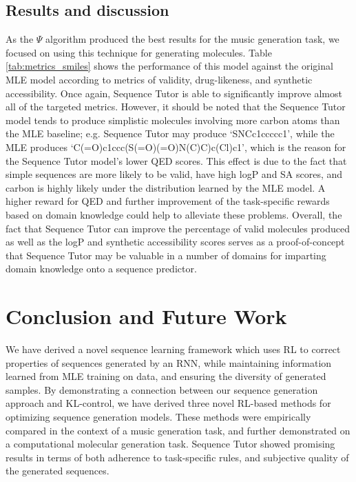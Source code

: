 \subsection{Results and discussion} As the $\Psi$ algorithm produced the best results for the music generation task, we focused on using this technique for generating molecules. Table \ref{tab:metrics_smiles} shows the performance of this model against the original MLE model according to metrics of validity, drug-likeness, and synthetic accessibility. Once again, Sequence Tutor is able to significantly improve almost all of the targeted metrics. However, it should be noted that the Sequence Tutor model tends to produce simplistic molecules involving more carbon atoms than the MLE baseline; e.g. Sequence Tutor may produce `SNCc1ccccc1', while the MLE produces `C(=O)c1ccc(S(=O)(=O)N(C)C)c(Cl)c1', which is the reason for the Sequence Tutor model's lower QED scores. This effect is due to the fact that simple sequences are more likely to be valid, have high logP and SA scores, and carbon is highly likely under the distribution learned by the MLE model. A higher reward for QED and further improvement of the task-specific rewards based on domain knowledge could help to alleviate these problems. Overall, the fact that Sequence Tutor can improve the percentage of valid molecules produced as well as the logP and synthetic accessibility scores serves as a proof-of-concept that Sequence Tutor may be valuable in a number of domains for imparting domain knowledge onto a sequence predictor.

\section{Conclusion and Future Work}

We have derived a novel sequence learning framework which uses RL to correct properties of sequences generated by an RNN, while maintaining information learned from MLE training on data, and ensuring the diversity of generated samples. By demonstrating a connection between our sequence generation approach and KL-control, we have derived three novel RL-based methods for optimizing sequence generation models. These methods were empirically compared in the context of a music generation task, and further demonstrated on a computational molecular generation task. Sequence Tutor showed promising results in terms of both adherence to task-specific rules, and subjective quality of the generated sequences. 

